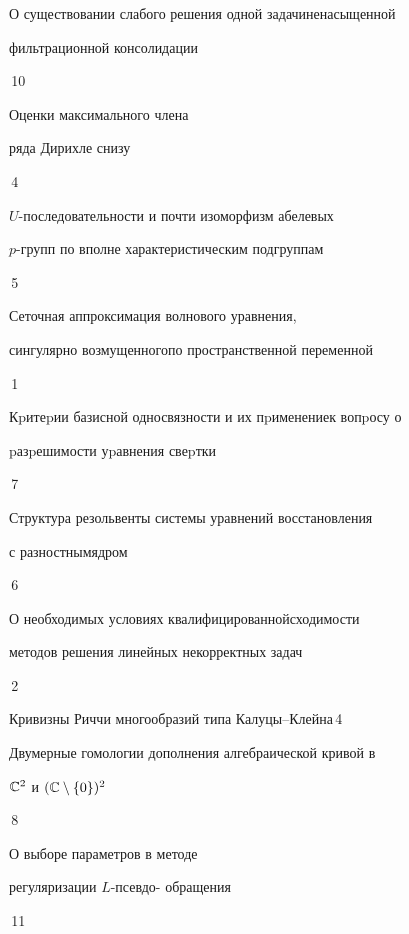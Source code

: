 {О существовании слабого решения одной задачи\newline ненасыщенной


фильтрационной консолидации}{\No\,10}




{Оценки максимального члена


ряда Дирихле снизу}{\No\,4}




{$U$-последовательности и почти изоморфизм абелевых\newline


$p$-групп по вполне характеристическим подгруппам}{\No\,5}




{Сеточная аппроксимация волнового уравнения,


сингулярно возмущенного\newline по пространственной переменной}{\No\,1}




{Кpитеpии базисной односвязности и их пpименение\newline к вопpосу о


pазpешимости уpавнения свеpтки}{\No\,7}




{Структура резольвенты системы уравнений восстановления


с разностным\newline ядром}{\No\,6}




{О необходимых условиях квалифицированной\newline сходимости 


методов решения линейных некорректных задач}{\No\,2}




{Кривизны Риччи многообразий типа Калуцы--Клейна}{\No\,4}




{Двумерные гомологии дополнения алгебраической кривой в


$\Bbb C^2$ и $(\Bbb C\setminus \{0\})^2$}{\No\,8}




{О выборе параметров в методе


регуляризации $L$-псевдо- \newline обращения}{\No\,11}











